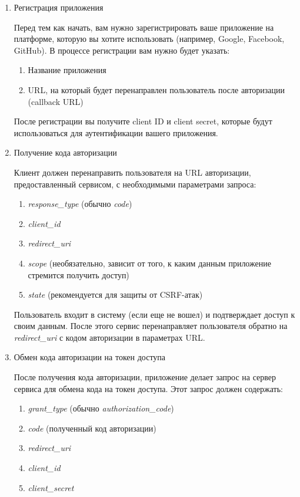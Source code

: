 \begin{enumerate}
	\item Регистрация приложения
	
	Перед тем как начать, вам нужно зарегистрировать ваше приложение на платформе, которую вы хотите использовать (например, Google, Facebook, GitHub). В процессе регистрации вам нужно будет указать:
	
	\begin{enumerate}
		\item Название приложения
		\item URL, на который будет перенаправлен пользователь после авторизации (callback URL)
	\end{enumerate}

	После регистрации вы получите client ID и client secret, которые будут использоваться для аутентификации вашего приложения.
	
	\item Получение кода авторизации
	
	Клиент должен перенаправить пользователя на URL авторизации, предоставленный сервисом, с необходимыми параметрами запроса:
	
	\begin{enumerate}
		\item \textit{response\_type} (обычно \textit{code})
		\item \textit{client\_id}
		\item \textit{redirect\_uri}
		\item \textit{scope} (необязательно, зависит от того, к каким данным приложение стремится получить доступ)
		\item \textit{state} (рекомендуется для защиты от CSRF-атак)
	\end{enumerate}
	
	Пользователь входит в систему (если еще не вошел) и подтверждает доступ к своим данным. После этого сервис перенаправляет пользователя обратно на \textit{redirect\_uri} с кодом авторизации в параметрах URL.
	
	\item Обмен кода авторизации на токен доступа
	
	После получения кода авторизации, приложение делает запрос на сервер сервиса для обмена кода на токен доступа. Этот запрос должен содержать:
	
	\begin{enumerate}
		\item \textit{grant\_type} (обычно \textit{authorization\_code})
		\item \textit{code} (полученный код авторизации)
		\item \textit{redirect\_uri}
		\item \textit{client\_id}
		\item \textit{client\_secret}
		

\end{enumerate}
\end{enumerate}
